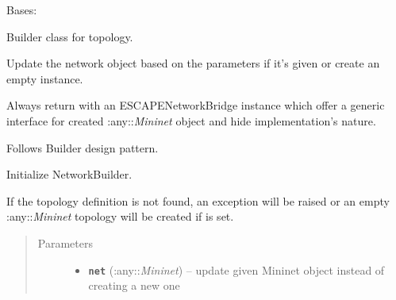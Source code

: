\documentclass[letterpaper,10pt,english]{sphinxmanual}
\begin{document}
\begin{fulllineitems}
\label{infr/topology:escape.infr.topology.ESCAPENetworkBuilder}
Bases: \href{https://docs.python.org/2.7/library/functions.html\#object}{}

Builder class for topology.

Update the network object based on the parameters if it's given or create
an empty instance.

Always return with an ESCAPENetworkBridge instance which offer a generic
interface for created :any::\emph{Mininet} object and hide implementation's nature.

Follows Builder design pattern.

\begin{fulllineitems}
\label{infr/topology:escape.infr.topology.ESCAPENetworkBuilder.default_opts}
\end{fulllineitems}


\begin{fulllineitems}
\label{infr/topology:escape.infr.topology.ESCAPENetworkBuilder.topology_config_name}
\end{fulllineitems}


\begin{fulllineitems}
\label{infr/topology:escape.infr.topology.ESCAPENetworkBuilder.__init__}
Initialize NetworkBuilder.

If the topology definition is not found, an exception will be raised or
an empty :any::\emph{Mininet} topology will be created if  is set.
\begin{quote}\begin{description}
\item[{Parameters}] \leavevmode\begin{itemize}
\item {} 
\textbf{\texttt{net}} (:any::\emph{Mininet}) -- update given Mininet object instead of creating a new one


\end{itemize}
\end{description}
\end{quote}
\end{fulllineitems}
\end{fulllineitems}
\end{document}
